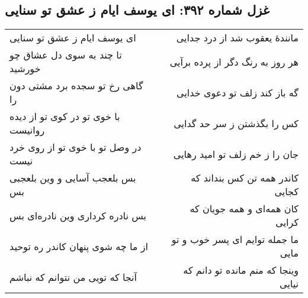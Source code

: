 \begin{center}
\section*{غزل شماره ۳۹۲: ای یوسف ایام ز عشق تو سنایی}
\label{sec:392}
\begin{longtable}{l p{0.5cm} r}
ای یوسف ایام ز عشق تو سنایی
&&
مانندهٔ یعقوب شد از درد جدایی
\\
تا چند به سوی دل عشاق چو خورشید
&&
هر روز به رنگ دگر از پرده برآیی
\\
گاهی رخ تو سجده برد مشتی دون را
&&
گه باز کند زلف تو دعوی خدایی
\\
با خوی تو در کوی تو از دیده روانیست
&&
کس را بگذشتن ز سر حد گدایی
\\
در وصل تو با خوی تو از روی خرد نیست
&&
جان را ز خم زلف تو امید رهایی
\\
بس بلعجب آسایی و وین بلعجبی بس
&&
کاندر همه تن کس بنداند که کجایی
\\
بس نادره کرداری وین نادره‌ای بس
&&
کان همه‌ای و همه جویان که کرایی
\\
از ما چه شوی پنهان کاندر ره توحید
&&
ما جمله توایم ای پسر خوب و تو مایی
\\
آنجا که تویی من نتوانم که نباشم
&&
وینجا که منم مانده تو دانم که نیایی
\\
\end{longtable}
\end{center}
